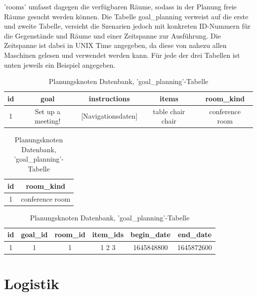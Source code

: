 'rooms' umfasst dagegen die verfügbaren Räume, sodass in der Planung freie Räume gesucht werden können. Die Tabelle goal\_planning verweist auf die erste und zweite Tabelle, versieht die Szenarien jedoch mit konkreten ID-Nummern für die Gegenstände und Räume und einer Zeitspanne zur Ausführung. Die Zeitspanne ist dabei in UNIX Time angegeben, da diese von nahezu allen Maschinen gelesen und verwendet werden kann. Für jede der drei Tabellen ist unten jeweils ein Beispiel angegeben.

\begin{table}[h]
\begin{center}
\begin{tabular}{| c | c | c | c | c |}
  \hline
  \textbf{id} & \textbf{goal}     & \textbf{instructions}    & \textbf{items}    & \textbf{room\_kind}\\
  \hline
  \hline
  1           & Set up a meeting! & [Navigationsdaten] & table chair chair & conference room    \\
  \hline
\end{tabular}
\caption{Planungsknoten Datenbank, 'goals'-Tabelle}
\end{center}
\begin{center}
\begin{tabular}{| c | c |}
  \hline
  \textbf{id} & \textbf{room\_kind} \\
  \hline
  \hline
  1           & conference room     \\
  \hline
\end{tabular}
\caption{Planungsknoten Datenbank, 'rooms'-Tabelle}
\end{center}
\begin{center}
\begin{tabular}{| c | c | c | c | c | c |}
  \hline
  \textbf{id} & \textbf{goal\_id} & \textbf{room\_id} & \textbf{item\_ids} & \textbf{begin\_date} & \textbf{end\_date} \\
  \hline
  \hline
  1           & 1                 & 1                 & 1 2 3              & 1645848800           & 1645872600         \\
  \hline
\end{tabular}
\caption{Planungsknoten Datenbank, 'goal\_planning'-Tabelle}
\end{center}
\end{table}


\FloatBarrier
\section{Logistik}


